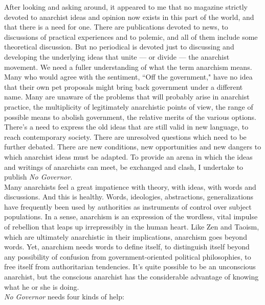 \documentclass[12pt, onecolumn, letterpaper, oneside]{book}
\begin{document}
After looking and asking around, it appeared to me that no magazine strictly devoted to anarchist ideas and opinion now exists in this part of the world, and that there is a need for one. There are publications devoted to news, to discussions of practical experiences and to polemic, and all of them include some theoretical discussion. But no periodical is devoted just to discussing and developing the underlying ideas that unite --- or divide --- the anarchist movement. We need a fuller understanding of what the term anarchism means. Many who would agree with the sentiment, ``Off the government," have no idea that their own pet proposals might bring back government under a different name. Many are unaware of the problems that will probably arise in anarchist practice, the multiplicity of legitimately anarchistic points of view, the range of possible means to abolish government, the relative merits of the various options.\\
There's a need to express the old ideas that are still valid in new language, to reach contemporary society. There are unresolved questions which need to be further debated. There are new conditions, new opportunities and new dangers to which anarchist ideas must be adapted. To provide an arena in which the ideas and writings of anarchists can meet, be exchanged and clash, I undertake to publish \emph{No Governor}.\\
Many anarchists feel a great impatience with theory, with ideas, with words and discussions. And this is healthy. Words, ideologies, abstractions, generalizations have frequently been used by authorities as instruments of control over subject populations. In a sense, anarchism is an expression of the wordless, vital impulse of rebellion that leaps up irrepressibly in the human heart. Like Zen and Taoism, which are ultimately anarchistic in their implications, anarchism goes beyond words. Yet, anarchism needs words to define itself, to distinguish itself beyond any possibility of confusion from government-oriented political philosophies, to free itself from authoritarian tendencies. It's quite possible to be an unconscious anarchist, but the conscious anarchist has the considerable advantage of knowing what he or she is doing.\\
\emph{No Governor} needs four kinds of help:
\end{document}
